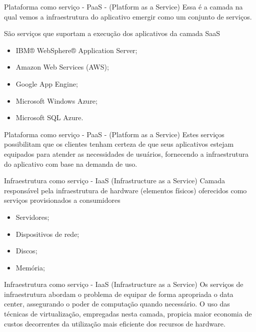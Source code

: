 \documentclass{beamer}
\begin{document}
\begin{frame}[fragile]{Plataforma como serviço - PaaS - (Platform as a Service)}\justifying
      Essa é a camada na qual vemos a infraestrutura do aplicativo emergir como um conjunto de serviços.
\end{frame}
\begin{frame}[fragile]{São serviços que suportam a execução dos aplicativos da camada SaaS}\justifying
      \begin{itemize}
            \item IBM® WebSphere® Application Server;
            \item Amazon Web Services (AWS);
            \item Google App Engine;
            \item Microsoft Windows Azure;
            \item Microsoft SQL Azure.
      \end{itemize}
\end{frame}
\begin{frame}[fragile]{Plataforma como serviço - PaaS - (Platform as a Service)}\justifying
      Estes serviços possibilitam que os clientes tenham certeza de que seus aplicativos estejam equipados para atender as necessidades de usuários, fornecendo a infraestrutura do aplicativo com base na demanda de uso.
\end{frame}
\begin{frame}[fragile]{Infraestrutura como serviço - IaaS (Infrastructure as a Service)}\justifying
      Camada responsável pela infraestrutura de hardware (elementos físicos) oferecidos como serviços provisionados a consumidores
      \begin{itemize}
            \item Servidores;
            \item Dispositivos de rede;
            \item Discos;
            \item Memória;
      \end{itemize}
\end{frame}
\begin{frame}[fragile]{Infraestrutura como serviço - IaaS (Infrastructure as a Service)}\justifying
      Os serviços de infraestrutura abordam o problema de equipar de forma apropriada o data center, assegurando o poder de computação quando necessário. O uso das técnicas de virtualização, empregadas nesta camada, propicia maior economia de custos decorrentes da utilização mais eficiente dos recursos de hardware.
\end{frame}
\end{document}
